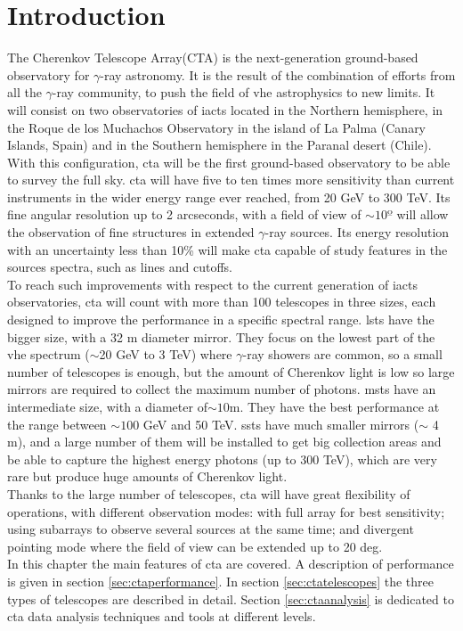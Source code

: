 \documentclass[main.tex]{subfiles}
\begin{document}
\glsresetall

\section{Introduction}

The Cherenkov Telescope Array(CTA)\cite{CTA} is the next-generation ground-based observatory for $\gamma$-ray astronomy. It is the result of the combination of efforts from all the $\gamma$-ray community, to push the field of \gls{vhe} astrophysics to new limits. It will consist on two observatories of \glspl{iact} located in the Northern hemisphere, in the Roque de los Muchachos Observatory in the island of La Palma (Canary Islands, Spain) and in the Southern hemisphere in the Paranal desert (Chile). With this configuration, \gls{cta} will be the first ground-based observatory to be able to survey the full sky. \gls{cta} will have five to ten times more sensitivity than current instruments in the wider energy range ever reached, from 20 GeV to 300 TeV. Its fine angular resolution up to 2 arcseconds, with a field of view of $\sim 10º$ will allow the observation of fine structures in extended $\gamma$-ray sources. Its energy resolution with an uncertainty less than 10\% will make \gls{cta} capable of study features in the sources spectra, such as lines and cutoffs.\\
To reach such improvements with respect to the current generation of \glspl{iact} observatories, \gls{cta} will count with more than 100 telescopes in three sizes, each designed to improve the performance in a specific spectral range. \glspl{lst} have the bigger size, with a 32 m diameter mirror. They focus on the lowest part of the \gls{vhe} spectrum ($\sim$20 GeV to 3 TeV) where $\gamma$-ray showers are common, so a small number of telescopes is enough, but the amount of Cherenkov light is low so large mirrors are required to collect the maximum number of photons. \glspl{mst} have an intermediate size, with a diameter of$\sim 10$m. They have the best performance at the range between $\sim 100$ GeV and 50 TeV. \glspl{sst} have much smaller mirrors ($\sim$ 4 m), and a large number of them will be installed to get big collection areas and be able to capture the highest energy photons (up to 300 TeV), which are very rare but produce huge amounts of Cherenkov light.\\
Thanks to the large number of telescopes, \gls{cta} will have great flexibility of operations, with different observation modes: with full array for best sensitivity; using subarrays to observe several sources at the same time; and divergent pointing mode where the field of view can be extended up to 20 deg.\\
In this chapter the main features of \gls{cta} are covered. A description of performance is given in section \ref{sec:ctaperformance}. In section \ref{sec:ctatelescopes} the three types of telescopes are described in detail. Section \ref{sec:ctaanalysis} is dedicated to \gls{cta} data analysis techniques and tools at different levels.
\end{document}
